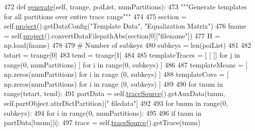 \begin{DoxyCode}
472     \textcolor{keyword}{def }\hyperlink{classsoftware_1_1chipwhisperer_1_1analyzer_1_1attacks_1_1cpa__algorithms_1_1experimentalchannelinfo_1_1TemplateCSI_ae2f13b800f3aad50dfca36f2ede60c9d}{generate}(self, trange, poiList, numPartitions):
473         \textcolor{stringliteral}{"""Generate templates for all partitions over entire trace range"""}
474 
475         section = self.\hyperlink{classsoftware_1_1chipwhisperer_1_1analyzer_1_1attacks_1_1cpa__algorithms_1_1experimentalchannelinfo_1_1TemplateCSI_a0b849488dc6c50d9b3b661827f87f7fb}{project}().getDataConfig(\textcolor{stringliteral}{"Template Data"}, \textcolor{stringliteral}{"Equalization Matrix"})
476         fname = self.\hyperlink{classsoftware_1_1chipwhisperer_1_1analyzer_1_1attacks_1_1cpa__algorithms_1_1experimentalchannelinfo_1_1TemplateCSI_a0b849488dc6c50d9b3b661827f87f7fb}{project}().convertDataFilepathAbs(section[0][\textcolor{stringliteral}{"filename"}])
477         H = np.load(fname)
478 
479         \textcolor{comment}{# Number of subkeys}
480         subkeys = len(poiList)
481 
482         tstart = trange[0]
483         tend = trange[1]
484 
485         templateTraces = [ [ [] \textcolor{keywordflow}{for} j \textcolor{keywordflow}{in} range(0, numPartitions) ] \textcolor{keywordflow}{for} i \textcolor{keywordflow}{in} range(0, subkeys) ]
486 
487         templateMeans = [ np.zeros(numPartitions) \textcolor{keywordflow}{for} i \textcolor{keywordflow}{in} range (0, subkeys) ]
488         templateCovs = [ np.zeros(numPartitions) \textcolor{keywordflow}{for} i \textcolor{keywordflow}{in} range (0, subkeys) ]
489 
490         \textcolor{keywordflow}{for} tnum \textcolor{keywordflow}{in} range(tstart, tend):
491             partData = self.\hyperlink{classsoftware_1_1chipwhisperer_1_1analyzer_1_1attacks_1_1cpa__algorithms_1_1experimentalchannelinfo_1_1TemplateCSI_a14927a5bb497ab99addff3da7d81e971}{traceSource}().getAuxData(tnum, self.partObject.attrDictPartition)[\textcolor{stringliteral}{"
      filedata"}]
492 
493             \textcolor{keywordflow}{for} bnum \textcolor{keywordflow}{in} range(0, subkeys):
494                 \textcolor{keywordflow}{for} i \textcolor{keywordflow}{in} range(0, numPartitions):
495 
496                     \textcolor{keywordflow}{if} tnum \textcolor{keywordflow}{in} partData[bnum][i]:
497                         trace = self.\hyperlink{classsoftware_1_1chipwhisperer_1_1analyzer_1_1attacks_1_1cpa__algorithms_1_1experimentalchannelinfo_1_1TemplateCSI_a14927a5bb497ab99addff3da7d81e971}{traceSource}().getTrace(tnum)

\end{DoxyCode}
